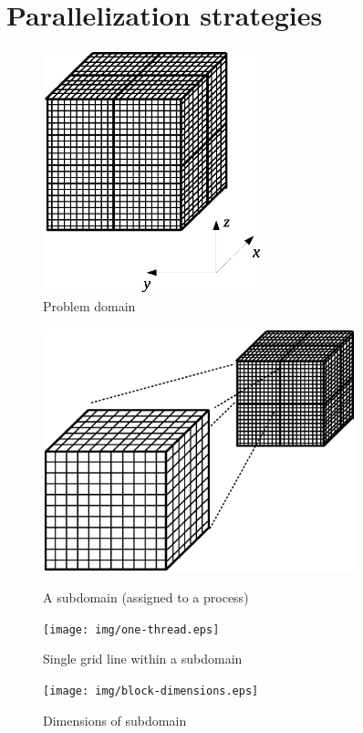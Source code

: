 \documentclass{article}
\begin{document}
\section{Parallelization strategies}

    \begin{figure}[h]
    \begin{center}
    \includegraphics[trim={{100pt} {150pt} {100pt} {150pt}}, clip, height=200pt]{img/domain.eps}
    \end{center}
    \caption{Problem domain}
    \label{fig:domain}
    \end{figure}
    \begin{figure}[ht]
    \begin{minipage}[b]{0.40\linewidth}
    \begin{center}
    \includegraphics[trim={{50pt} {50pt} {50pt} {50pt}}, clip, height=200pt]{img/one-block.eps}
    \end{center}
    \caption{A subdomain (assigned to a process)}
    \label{fig:block}
    \end{minipage}
    \hspace{0.5cm}
    \begin{minipage}[b]{0.40\linewidth}
    \begin{center}
    \texttt{[image: img/one-thread.eps]}
    \end{center}
    \caption{Single grid line within a subdomain}
    \label{fig:grid-line}
    \end{minipage}
    \end{figure}
    \begin{figure}[h]
    \begin{center}
    \texttt{[image: img/block-dimensions.eps]}
    \end{center}
    \caption{Dimensions of subdomain}
    \label{fig:block-dimensions}
    \end{figure}
\end{document}
